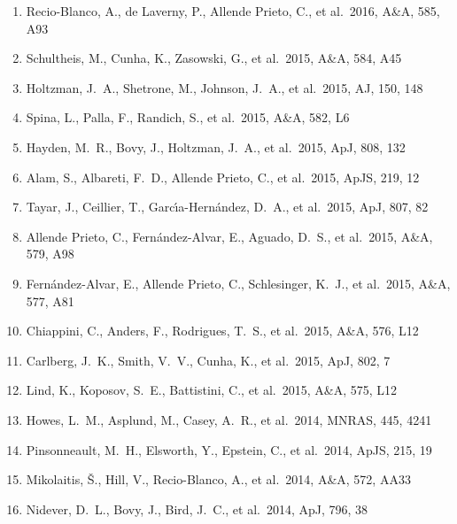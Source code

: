 \documentclass[12pt]{article}
\begin{document}
\begin{enumerate}
\item Recio-Blanco, A., de Laverny, P., Allende Prieto, C., et al.\ 2016, A\&A, 585, A93 


\item Schultheis, M., Cunha, K., Zasowski, G., et al.\ 2015, A\&A, 584, A45 


\item Holtzman, J.~A., 
Shetrone, M., Johnson, J.~A., et al.\ 2015, AJ, 150, 148 


\item Spina, L., Palla, F., Randich, S., et al.\ 2015, A\&A, 582, L6 


\item Hayden, M.~R., Bovy, J., 
Holtzman, J.~A., et al.\ 2015, ApJ, 808, 132 


\item Alam, S., Albareti, F.~D., 
Allende Prieto, C., et al.\ 2015, ApJS, 219, 12 


\item Tayar, J., Ceillier, T., 
Garc{\'{\i}}a-Hern{\'a}ndez, D.~A., et al.\ 2015, ApJ, 807, 82 


\item Allende Prieto, C., Fern{\'a}ndez-Alvar, E., Aguado, D.~S., et al.\ 2015, A\&A, 579, A98 


\item  Fern{\'a}ndez-Alvar, E., Allende Prieto, C., Schlesinger, K.~J., et al.\ 2015, A\&A, 577, A81 


\item Chiappini, C., Anders, F., Rodrigues, T.~S., et al.\ 2015, A\&A, 576, L12 


\item Carlberg, J.~K., Smith, V.~V., Cunha, K., et al.\ 2015, ApJ, 802, 7 


\item Lind, K., Koposov, S.~E., Battistini, C., et al.\ 2015, A\&A, 575, L12 


\item Howes, L.~M., Asplund, 
M., Casey, A.~R., et al.\ 2014, MNRAS, 445, 4241 


\item Pinsonneault, 
M.~H., Elsworth, Y., Epstein, C., et al.\ 2014, ApJS, 215, 19 


\item Mikolaitis, {\v S}., Hill, V., Recio-Blanco, A., et al.\ 2014, A\&A, 572, AA33 


\item Nidever, D.~L., Bovy, 
J., Bird, J.~C., et al.\ 2014, ApJ, 796, 38 



\end{enumerate}
\end{document}
